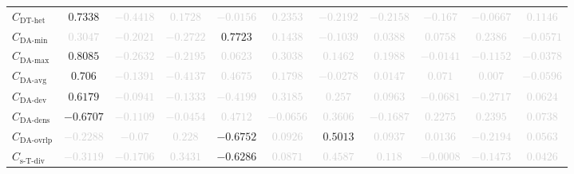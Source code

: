 \documentclass{standalone}
\newcommand{\dthetname}{\text{DT-het}}
\newcommand{\dthet}{C_{\dthetname}}
\newcommand{\daminname}{\text{DA-min}}
\newcommand{\damin}{C_{\daminname}}
\newcommand{\daavgname}{\text{DA-avg}}
\newcommand{\daavg}{C_{\daavgname}}
\newcommand{\damaxname}{\text{DA-max}}
\newcommand{\damax}{C_{\damaxname}}
\newcommand{\dadevname}{\text{DA-dev}}
\newcommand{\dadev}{C_{\dadevname}}
\newcommand{\dadensname}{\text{DA-dens}}
\newcommand{\dadens}{C_{\dadensname}}
\newcommand{\daoverlapname}{\text{DA-ovrlp}}
\newcommand{\daoverlap}{C_{\daoverlapname}}
\newcommand{\simpletracedivname}{\text{s-T-div}}
\newcommand{\simpletracediv}{C_{\simpletracedivname}}
\begin{document}
\begin{tabular}{lcccccccccc}
$\dthet$ & $0.7338$ & \textcolor{lightgray}{$-0.4418$} & \textcolor{lightgray}{$0.1728$} & \textcolor{lightgray}{$-0.0156$} & \textcolor{lightgray}{$0.2353$} & \textcolor{lightgray}{$-0.2192$} & \textcolor{lightgray}{$-0.2158$} & \textcolor{lightgray}{$-0.167$} & \textcolor{lightgray}{$-0.0667$} & \textcolor{lightgray}{$0.1146$} \\ 
$\damin$ & \textcolor{lightgray}{$0.3047$} & \textcolor{lightgray}{$-0.2021$} & \textcolor{lightgray}{$-0.2722$} & $0.7723$ & \textcolor{lightgray}{$0.1438$} & \textcolor{lightgray}{$-0.1039$} & \textcolor{lightgray}{$0.0388$} & \textcolor{lightgray}{$0.0758$} & \textcolor{lightgray}{$0.2386$} & \textcolor{lightgray}{$-0.0571$} \\ 
$\damax$ & $0.8085$ & \textcolor{lightgray}{$-0.2632$} & \textcolor{lightgray}{$-0.2195$} & \textcolor{lightgray}{$0.0623$} & \textcolor{lightgray}{$0.3038$} & \textcolor{lightgray}{$0.1462$} & \textcolor{lightgray}{$0.1988$} & \textcolor{lightgray}{$-0.0141$} & \textcolor{lightgray}{$-0.1152$} & \textcolor{lightgray}{$-0.0378$} \\ 
$\daavg$ & $0.706$ & \textcolor{lightgray}{$-0.1391$} & \textcolor{lightgray}{$-0.4137$} & \textcolor{lightgray}{$0.4675$} & \textcolor{lightgray}{$0.1798$} & \textcolor{lightgray}{$-0.0278$} & \textcolor{lightgray}{$0.0147$} & \textcolor{lightgray}{$0.071$} & \textcolor{lightgray}{$0.007$} & \textcolor{lightgray}{$-0.0596$} \\ 
$\dadev$ & $0.6179$ & \textcolor{lightgray}{$-0.0941$} & \textcolor{lightgray}{$-0.1333$} & \textcolor{lightgray}{$-0.4199$} & \textcolor{lightgray}{$0.3185$} & \textcolor{lightgray}{$0.257$} & \textcolor{lightgray}{$0.0963$} & \textcolor{lightgray}{$-0.0681$} & \textcolor{lightgray}{$-0.2717$} & \textcolor{lightgray}{$0.0624$} \\ 
$\dadens$ & $-0.6707$ & \textcolor{lightgray}{$-0.1109$} & \textcolor{lightgray}{$-0.0454$} & \textcolor{lightgray}{$0.4712$} & \textcolor{lightgray}{$-0.0656$} & \textcolor{lightgray}{$0.3606$} & \textcolor{lightgray}{$-0.1687$} & \textcolor{lightgray}{$0.2275$} & \textcolor{lightgray}{$0.2395$} & \textcolor{lightgray}{$0.0738$} \\ 
$\daoverlap$ & \textcolor{lightgray}{$-0.2288$} & \textcolor{lightgray}{$-0.07$} & \textcolor{lightgray}{$0.228$} & $-0.6752$ & \textcolor{lightgray}{$0.0926$} & $0.5013$ & \textcolor{lightgray}{$0.0937$} & \textcolor{lightgray}{$0.0136$} & \textcolor{lightgray}{$-0.2194$} & \textcolor{lightgray}{$0.0563$} \\ 
$\simpletracediv$ & \textcolor{lightgray}{$-0.3119$} & \textcolor{lightgray}{$-0.1706$} & \textcolor{lightgray}{$0.3431$} & $-0.6286$ & \textcolor{lightgray}{$0.0871$} & \textcolor{lightgray}{$0.4587$} & \textcolor{lightgray}{$0.118$} & \textcolor{lightgray}{$-0.0008$} & \textcolor{lightgray}{$-0.1473$} & \textcolor{lightgray}{$0.0426$} \\ 

\end{tabular}
\end{document}
